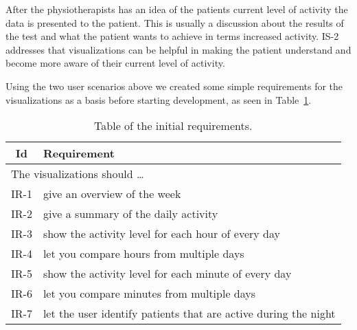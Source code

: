 After the physiotherapists has an idea of the patients current level of activity the data is presented to the patient. This is usually a discussion about the results of the test and what the patient wants to achieve in terms increased activity. IS-2 addresses that visualizations can be helpful in making the patient understand and become more aware of their current level of activity.

Using the two user scenarios above we created some simple requirements for the visualizations as a basis before starting development, as seen in Table~\ref{tab:initialRequirements1}.

\begin{table}[h!]
  \begin{center}
  \begin{tabular}{|c|p{12cm}|}
    \hline
      \textbf{Id} & \textbf{Requirement} \\ \hline
    \multicolumn{2}{|l|}{The visualizations should \ldots} \\ \hline
      IR-1 & give an overview of the week \\ \hline
      IR-2 & give a summary of the daily activity \\ \hline
      IR-3 & show the activity level for each hour of every day \\ \hline
      IR-4 & let you compare hours from multiple days \\ \hline
      IR-5 & show the activity level for each minute of every day \\ \hline
      IR-6 & let you compare minutes from multiple days \\ \hline
      IR-7 & let the user identify patients that are active during the night \\ \hline
  \end{tabular}
  \end{center}
  \caption{Table of the initial requirements.}
  \label{tab:initialRequirements1}
\end{table}

